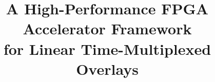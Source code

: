 \documentclass[conference]{IEEEtran}
\begin{document}
\title{A High-Performance FPGA Accelerator Framework \\for Linear Time-Multiplexed Overlays\\
}

\begin{comment}
\author{\IEEEauthorblockN{1\textsuperscript{st} Given Name Surname}
\IEEEauthorblockA{\textit{dept. name of organization (of Aff.)} \\
\textit{name of organization (of Aff.)}\\
City, Country \\
email address}
\and
\IEEEauthorblockN{2\textsuperscript{nd} Given Name Surname}
\IEEEauthorblockA{\textit{dept. name of organization (of Aff.)} \\
\textit{name of organization (of Aff.)}\\
City, Country \\
email address}
\and
\IEEEauthorblockN{3\textsuperscript{rd} Given Name Surname}
\IEEEauthorblockA{\textit{dept. name of organization (of Aff.)} \\
\textit{name of organization (of Aff.)}\\
City, Country \\
email address}
\and
\IEEEauthorblockN{4\textsuperscript{th} Given Name Surname}
\IEEEauthorblockA{\textit{dept. name of organization (of Aff.)} \\
\textit{name of organization (of Aff.)}\\
City, Country \\
email address}
\and
\IEEEauthorblockN{5\textsuperscript{th} Given Name Surname}
\IEEEauthorblockA{\textit{dept. name of organization (of Aff.)} \\
\textit{name of organization (of Aff.)}\\
City, Country \\
email address}
\and
\IEEEauthorblockN{6\textsuperscript{th} Given Name Surname}
\IEEEauthorblockA{\textit{dept. name of organization (of Aff.)} \\
\textit{name of organization (of Aff.)}\\
City, Country \\
email address}
}
\end{comment}

\maketitle
\end{document}
